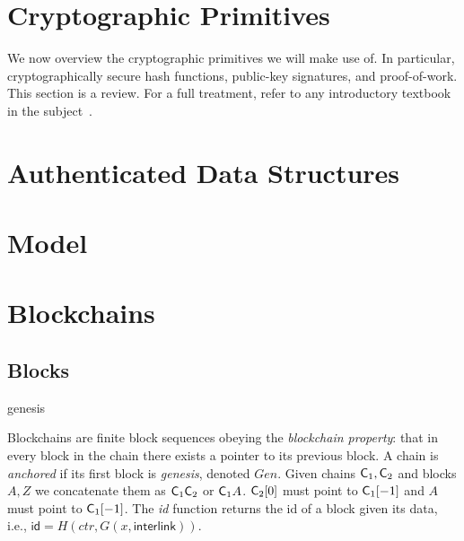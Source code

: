 \section{Cryptographic Primitives}

We now overview the cryptographic primitives we will make use of. In particular,
cryptographically secure hash functions, public-key signatures, and
proof-of-work. This section is a review. For a full
treatment, refer to any introductory textbook in the subject~\cite{katz,handbook,foundations1,foundations2}.




\section{Authenticated Data Structures}


\section{Model}






\section{Blockchains}



\subsection{Blocks}
genesis


Blockchains are finite
block sequences obeying the \emph{blockchain property}: that in every block in
the chain there exists a pointer to its previous block. A chain is
\emph{anchored} if its first block is \emph{genesis}, denoted $Gen$.
Given chains $\mathsf{C}_1, \mathsf{C}_2$ and blocks $A, Z$ we concatenate them as
$\mathsf{C}_1 \mathsf{C}_2$ or $\mathsf{C}_1 A$. $\mathsf{C}_2[0]$ must point to $\mathsf{C}_1[-1]$
and $A$ must point to $\mathsf{C}_1[-1]$.
The \emph{id} function
returns the id of a block given its data, i.e., $\textsf{id} = H(ctr, G(x,
\textsf{interlink}))$.

